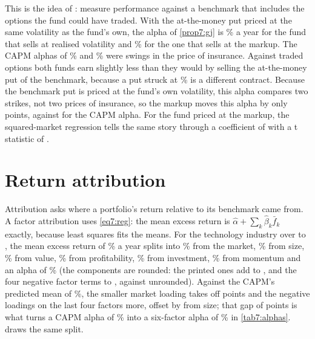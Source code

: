 \begin{chapterrefs}
This is the idea of \textcite{glosten1994}: measure performance against a benchmark that includes the
options the fund could have traded. With the at-the-money put priced at the same volatility as the
fund's own, the alpha of \cref{prop7:gj} is \poZeroAdj\% a year for the fund that sells at realised
volatility and \poTwentyAdj\% for the one that sells at the markup. The CAPM alphas of \poZeroA\% and
\poTwentyA\% were swings in the price of insurance. Against traded options both funds earn slightly less than
they would by selling the at-the-money put of the benchmark, because a put struck at \poMoney\% is a
different contract. Because the benchmark put is priced at the fund's own volatility, this alpha compares two strikes, not
two prices of insurance, so the markup moves this alpha by only \poMarkupAdj{} points, against
\poMarkupCapm{} for the CAPM alpha. For the fund priced at the
markup, the squared-market regression tells the same story through a coefficient of \poTwentyTmG{}
with a t statistic of \poTwentyTmT.


\FloatBarrier
\section{Return attribution}
\label{sec7:attribution}

Attribution asks where a portfolio's return relative to its benchmark came from. A factor
attribution uses \cref{eq7:reg}: the mean excess return is $\hat\alpha+\sum_k\hat\beta_k\bar f_k$
exactly, because least squares fits the means. For the technology industry over \fqFirst{} to \fqLast,
the mean excess return of \faMean\% a year splits into \faMkt\% from the market, \faSmb\% from size,
\faHml\% from value, \faRmw\% from profitability, \faCma\% from investment, \faMom\% from momentum and
an alpha of \faAlpha\% (the components are rounded: the printed ones add to \faRoundedSum, and the four negative factor terms
to \faFourRoundedNeg, against \faFourNegSigned{} unrounded). Against the CAPM's predicted mean of \faCapmPred\%, the smaller market loading takes off \faMktDrop{}
points and the negative loadings on the last four factors \faFourNeg{} more, offset by \faSmb{} from
size; that gap of \faGap{} points is what turns a CAPM alpha of \alHiTecCapm\% into a six-factor alpha
of \faAlpha\% in \cref{tab7:alphas}.  draws the same split.


\end{chapterrefs}
